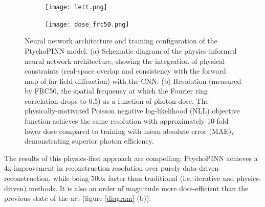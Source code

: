 \documentclass{article}
\begin{document}
\begin{figure}[htbp]
    \centering
    \begin{subfigure}{\textwidth}
        \centering
        \texttt{[image: lett.png]}
        \caption{} %
        \label{fig:architecture}
    \end{subfigure}
    \vspace{0.5cm}  %
    \begin{subfigure}{\textwidth}
        \centering
        \texttt{[image: dose\_frc50.png]}
        \caption{} 
        \label{fig:efficiency}
    \end{subfigure}
  \caption{Neural network architecture and training configuration of the PtychoPINN model. (a) Schematic diagram of the physics-informed neural network architecture, showing the integration of physical constraints (real-space overlap and consistency with the forward map of far-field diffraction) with the CNN. (b) Resolution (measured by FRC50, the spatial frequency at which the Fourier ring correlation drops to 0.5) as a function of photon dose. The physically-motivated Poisson negative log-likelihood (NLL) objective function achieves the same resolution with approximately 10-fold lower dose compared to training with mean absolute error (MAE), demonstrating superior photon efficiency. }\label{diagram}
    \label{fig:combined}
\end{figure}


The results of this physics-first approach are compelling: PtychoPINN achieves a 4x improvement in reconstruction resolution over purely data-driven reconstruction, while being 500x faster than traditional (i.e. iterative and physics-driven) methods. It is also an order of magnitude more dose-efficient than the previous state of the art (figure \ref{diagram} (b)).
\end{document}
